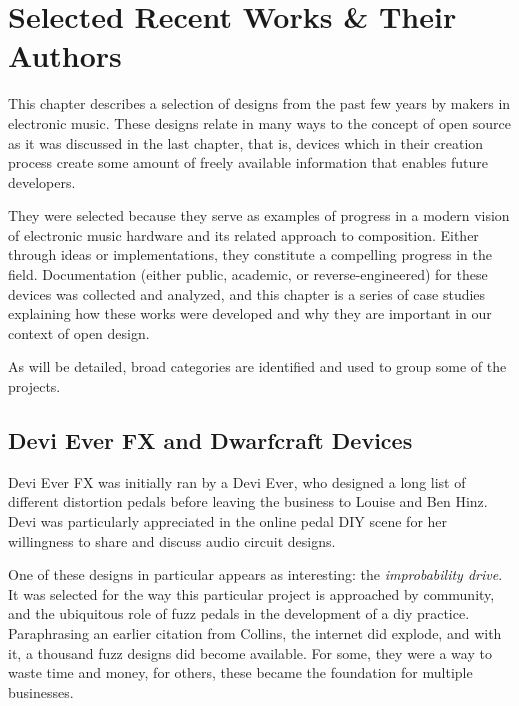 \chapter{Selected Recent Works & Their Authors}\label{selrecworks}

This chapter describes a selection of designs from the past few years by makers in electronic music. These designs relate in many ways to the concept of open source as it was discussed in the last chapter, that is, devices which in their creation process create some amount of freely available information that enables future developers.

They were selected because they serve as examples of progress in a modern vision of electronic music hardware and its related approach to composition. Either through ideas or implementations, they constitute a compelling progress in the field. Documentation (either public, academic, or reverse-engineered) for these devices was collected and analyzed, and this chapter is a series of case studies explaining how these works were developed and why they are important in our context of open design. 

As will be detailed, broad categories are identified and used to group some of the projects. 

\section{Devi Ever FX and Dwarfcraft Devices}

Devi Ever FX was initially ran by a Devi Ever, who designed a long list of different distortion pedals before leaving the business to Louise and Ben Hinz. Devi was particularly appreciated in the online pedal DIY scene for her willingness to share and discuss audio circuit designs. 

One of these designs in particular appears as interesting: the \emph{improbability drive}. It was selected for the way this particular project is approached by community, and the ubiquitous role of fuzz pedals in the development of a diy practice. Paraphrasing an earlier citation from Collins, the internet did explode, and with it, a thousand fuzz designs did become available. For some, they were a way to waste time and money, for others, these became the foundation for multiple businesses. 

